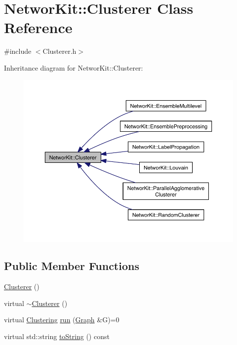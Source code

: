 \hypertarget{class_networ_kit_1_1_clusterer}{\section{Networ\-Kit\-:\-:Clusterer Class Reference}
\label{class_networ_kit_1_1_clusterer}
}


{\ttfamily \#include $<$Clusterer.\-h$>$}



Inheritance diagram for Networ\-Kit\-:\-:Clusterer\-:\nopagebreak
\begin{figure}[H]
\begin{center}
\leavevmode
\includegraphics[width=350pt]{class_networ_kit_1_1_clusterer__inherit__graph}
\end{center}
\end{figure}
\subsection*{Public Member Functions}
\begin{DoxyCompactItemize}
\item 
\hyperlink{class_networ_kit_1_1_clusterer_a53d6682f2cafa593568694e3bbce1c35}{Clusterer} ()
\item 
virtual \hyperlink{class_networ_kit_1_1_clusterer_a1d198eb824dae182f4791e55b172f367}{$\sim$\-Clusterer} ()
\item 
virtual \hyperlink{class_networ_kit_1_1_clustering}{Clustering} \hyperlink{class_networ_kit_1_1_clusterer_ab881df49f4398d2c94b5429d7dfa88f1}{run} (\hyperlink{class_networ_kit_1_1_graph}{Graph} \&G)=0
\item 
virtual std\-::string \hyperlink{class_networ_kit_1_1_clusterer_ae67135b9fb55c4166ca7d50b720939da}{to\-String} () const 
\end{DoxyCompactItemize}


